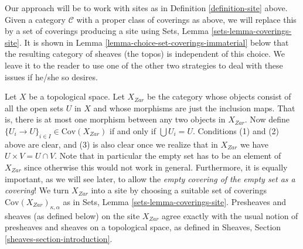 \begin{remark}
\medskip\noindent
Our approach will be to work with sites as in Definition \ref{definition-site}
above. Given a category $\mathcal{C}$ with a proper class of coverings
as above, we will replace this by a set of coverings producing a site using
Sets, Lemma \ref{sets-lemma-coverings-site}. It is shown in
Lemma \ref{lemma-choice-set-coverings-immaterial} below that the resulting
category of sheaves (the topos) is independent of this choice. We leave it to
the reader to use one of the other two strategies to deal with these issues if
he/she so desires.
\end{remark}

\begin{example}
\label{example-site-topological}
Let $X$ be a topological space. Let $X_{Zar}$ be the category whose
objects consist of all the open sets $U$ in $X$ and whose morphisms
are just the inclusion maps. That is, there is at most one morphism
between any two objects in $X_{Zar}$. Now define
$\{U_i \to U\}_{i \in I}\in \text{Cov}(X_{Zar})$ if
and only if $\bigcup U_i = U$.
Conditions (1) and (2) above are clear, and (3) is also
clear once we realize that in $X_{Zar}$ we have
$U \times V = U \cap V$. Note that in particular the empty
set has to be an element of $X_{Zar}$ since otherwise
this would not work in general. Furthermore, it is equally important,
as we will see later, to allow the {\it empty covering of the empty
set as a covering}!
We turn $X_{Zar}$ into a site
by choosing a suitable set of coverings
$\text{Cov}(X_{Zar})_{\kappa, \alpha}$ as in
Sets, Lemma \ref{sets-lemma-coverings-site}.
Presheaves and sheaves (as defined below)
on the site $X_{Zar}$ agree exactly with the usual notion of
presheaves and sheaves on a topological space, as defined
in Sheaves, Section \ref{sheaves-section-introduction}.
\end{example}

